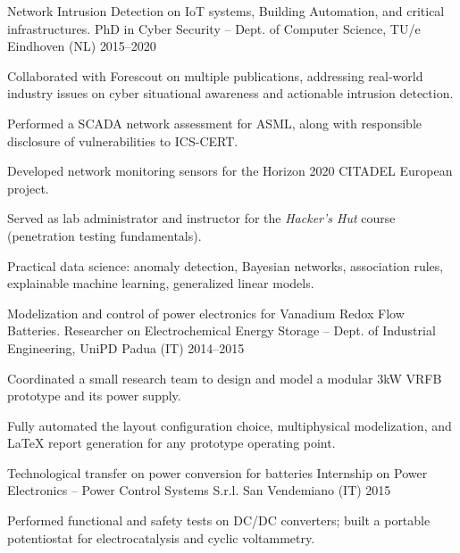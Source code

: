 
\begin{cventries}
    \cventry%
        {Network Intrusion Detection on IoT systems, Building Automation, and critical infrastructures.} %
        {PhD in Cyber Security -- Dept. of Computer Science, TU/e} %
        {Eindhoven (NL)} %
        {2015--2020} %
        {\begin{cvitems}
            \item Collaborated with Forescout on multiple publications, addressing real-world industry issues on cyber situational awareness and actionable intrusion detection.
            \item Performed a SCADA network assessment for ASML, along with responsible disclosure of vulnerabilities to ICS-CERT.
            \item Developed network monitoring sensors for the Horizon 2020 CITADEL European project.
            \item Served as lab administrator and instructor for the \emph{Hacker's Hut} course (penetration testing fundamentals).
            \item Practical data science: anomaly detection, Bayesian networks, association rules, explainable machine learning, generalized linear models.
        \end{cvitems}}


    \cventry%
        {Modelization and control of power electronics for Vanadium Redox Flow Batteries.}
        {Researcher on Electrochemical Energy Storage -- Dept. of Industrial Engineering, UniPD}
        {Padua (IT)}
        {2014--2015}
        {\begin{cvitems}
            \item Coordinated a small research team to design and model a modular 3kW VRFB prototype and its power supply.
            \item Fully automated the layout configuration choice, multiphysical modelization, and LaTeX report generation for any prototype operating point.
        \end{cvitems}}

    \cventry%
        {Technological transfer on power conversion for batteries}
        {Internship on Power Electronics -- Power Control Systems S.r.l.}
        {San Vendemiano (IT)}
        {2015}
        {\begin{cvitems}
            \item Performed functional and safety tests on DC/DC converters; built a portable potentiostat for electrocatalysis and cyclic voltammetry.
        \end{cvitems}}


\end{cventries}
